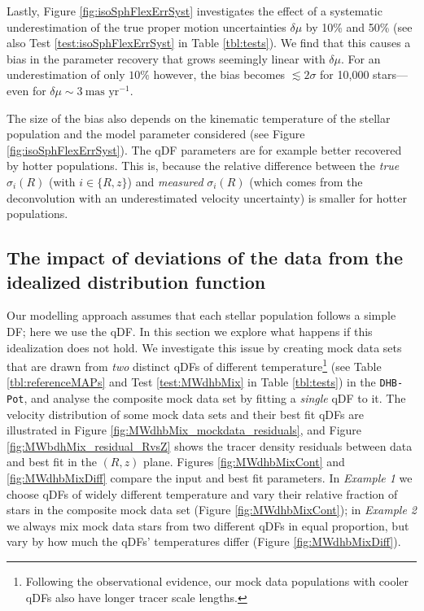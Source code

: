 \documentclass[iop,revtex4,numberedappendix,appendixfloats]{emulateapj}
\begin{document}
Lastly, Figure \ref{fig:isoSphFlexErrSyst} investigates the effect of a systematic underestimation of the true proper motion uncertainties $\delta \mu$ by 10\% and 50\% (see also Test \ref{test:isoSphFlexErrSyst} in Table \ref{tbl:tests}). We find that this causes a bias in the parameter recovery that grows seemingly linear with $\delta \mu$. For an underestimation of only $10\%$ however, the bias becomes $\lesssim 2 \sigma$ for 10,000 stars---even for $\delta \mu \sim 3~\text{mas yr}^{-1}$.

The size of the bias also depends on the kinematic temperature of the stellar population and the model parameter considered (see Figure \ref{fig:isoSphFlexErrSyst}). The qDF parameters are for example better recovered by hotter populations. This is, because the relative difference between the \emph{true} $\sigma_i(R)$ (with $i \in \{R,z\}$) and \emph{measured} $\sigma_i(R)$ (which comes from the deconvolution with an underestimated velocity uncertainty) is smaller for hotter populations. 

\subsection{The impact of deviations of the data from the idealized distribution function} \label{sec:results_mixedDFs}

Our modelling approach assumes that each stellar population follows a simple DF; here we use the qDF. In this section we explore what happens if this idealization does not hold. We investigate this issue by creating mock data sets that are drawn from \emph{two} distinct qDFs of different temperature\footnote{Following the observational evidence, our mock data populations with cooler qDFs also have longer tracer scale lengths.} (see Table \ref{tbl:referenceMAPs} and Test \ref{test:MWdhbMix} in Table \ref{tbl:tests}) in the \texttt{DHB-Pot}, and analyse the composite mock data set by fitting a \emph{single} qDF to it. The velocity distribution of some mock data sets and their best fit qDFs are illustrated in Figure \ref{fig:MWdhbMix_mockdata_residuals}, and Figure \ref{fig:MWbdhMix_residual_RvsZ} shows the tracer density residuals between data and best fit in the $(R,z)$ plane. Figures \ref{fig:MWdhbMixCont} and \ref{fig:MWdhbMixDiff} compare the input and best fit parameters. In \emph{Example 1} we choose qDFs of widely different temperature and vary their relative fraction of stars in the composite mock data set (Figure \ref{fig:MWdhbMixCont}); in \emph{Example 2} we always mix mock data stars from two different qDFs in equal proportion, but vary by how much the qDFs' temperatures differ (Figure \ref{fig:MWdhbMixDiff}). 
\end{document}
